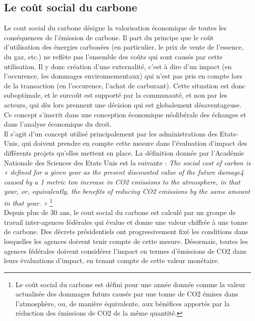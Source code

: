 

\subsection{Le coût social du carbone}
\label{sect:1.3.2}

Le {cout social du carbone} désigne la valorisation économique de toutes les conséquences de l'émission de carbone. Il part du principe que le coût d'utilisation des énergies carbonées (en particulier, le prix de vente de l'essence, du gaz, etc.) ne reflète pas l'ensemble des coûts qui sont causés par cette utilisation. Il y donc création d'une externalité, c'est à dire d'un impact (en l'occurence, les dommages environnementaux) qui n'est pas pris en compte lors de la transaction (en l'occurence, l'achat de carburant). Cette situation est donc suboptimale, et le surcoût est supporté par la communauté, et non par les acteurs, qui dès lors prennent une décision qui est globalement désaventageuse. Ce concept s'inscrit dans une conception économique néolibérale des échanges et dans l'analyse économique du droit.  \\

Il s'agit d'un concept utilisé principalement par les administrations des Etats-Unis, qui doivent prendre en compte cette mesure dans l'évaluation d'impact des différents projets qu'elles mettent en place. La définition donnée par l'Académie Nationale des Sciences des Etats Unis est la suivante : \emph{The social cost of carbon is « defined for a given year as the present discounted value of the future damage4 caused by a 1 metric ton increase in CO2 emissions to the atmosphere, in that year, or, equivalently, the benefits of reducing CO2 emissions by the same amount in that year. » }\footnote{Le coût social du carbone est défini pour une année donnée comme la valeur actualisée des dommages futurs causés par une tonne de CO2 émises dans l'atmosphère, ou, de manière équivalente, aux bénéfices apportés par la réduction des émissions de CO2 de la même quantité.} \\

Depuis plus de 30 ans, le \gls{cout social du carbone} est calculé par un groupe de travail inter-agences fédérales qui évalue et donne une valeur chiffrée à une tonne de carbone. Des décrets présidentiels ont progressivement fixé les conditions dans lesquelles les agences doivent tenir compte de cette mesure. Désormais, toutes les agences fédérales doivent considérer l'impact en termes d’émissions de CO2 dans leurs évaluations d'impact, en tenant compte de cette valeur monétaire. \\

